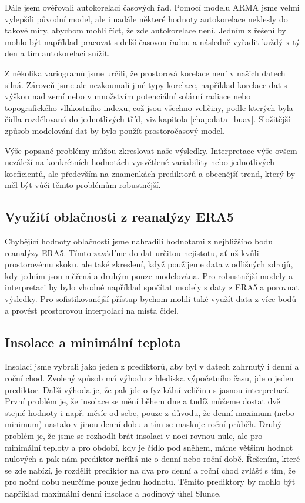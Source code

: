 Dále jsem ověřovali autokorelaci časových řad. Pomocí modelu ARMA jsme velmi vylepšili původní model, ale i nadále některé hodnoty autokorelace neklesly do takové míry, abychom mohli říct, že zde autokorelace není. Jedním z řešení by mohlo být například pracovat s delší časovou řadou a následně vyřadit každý x-tý den a tím autokorelaci snížit. 

Z několika variogramů jsme určili, že prostorová korelace není v našich datech silná. Zároveň jsme ale nezkoumali jiné typy korelace, například korelace dat s výškou nad zemí nebo v množstvím potenciální solární radiace nebo topografického vlhkostního indexu, což jsou všechno veličiny, podle kterých byla čidla rozdělovaná do jednotlivých tříd, viz kapitola \ref{chap:data_buav}. Složitější způsob modelování dat by bylo použít prostoročasový model.

Výše popsané problémy můžou zkreslovat naše výsledky. Interpretace výše ovšem nezáleží na konkrétních hodnotách vysvětlené variability nebo jednotlivých koeficientů, ale především na znamenkách prediktorů a obecnější trend, který by měl být vůči těmto problémům robustnější.

\subsection{Využití oblačnosti z reanalýzy ERA5}\label{chap:disc_era5}
Chybějící hodnoty oblačnosti jsme nahradili hodnotami z nejbližšího bodu reanalýzy ERA5. Tímto zavádíme do dat určitou nejistotu, ať už kvůli prostorovému skoku, ale také zkreslení, když použijeme data z odlišných zdrojů, kdy jedním jsou měřená a druhým pouze modelována. Pro robustnější modely a interpretaci by bylo vhodné například spočítat modely s daty z ERA5 a porovnat výsledky. Pro sofistikovanější přístup bychom mohli také využít data z více bodů a provést prostorovou interpolaci na místa čidel.

\subsection{Insolace a minimální teplota}\label{chap:mintemp_insolation}
Insolaci jsme vybrali jako jeden z prediktorů, aby byl v datech zahrnutý i denní a roční chod. Zvolený způsob má výhodu z hlediska výpočetního času, jde o jeden prediktor. Další výhoda je, že pak jde o fyzikální veličinu s jasnou interpretací. První problém je, že insolace se mění během dne a tudíž můžeme dostat dvě stejné hodnoty i např. měsíc od sebe, pouze z důvodu, že denní maximum (nebo minimum) nastalo v jinou denní dobu a tím se maskuje roční průběh. Druhý problém je, že jsme se rozhodli brát insolaci v noci rovnou nule, ale pro minimální teploty a pro období, kdy je čidlo pod sněhem, máme většinu hodnot nulových a pak nám prediktor neříká nic o denní nebo roční době. Řešením, které se zde nabízí, je rozdělit prediktor na dva pro denní a roční chod zvlášť s tím, že pro noční dobu neurčíme pouze jednu hodnotu. Těmito prediktory by mohlo být například maximální denní insolace a hodinový úhel Slunce.
